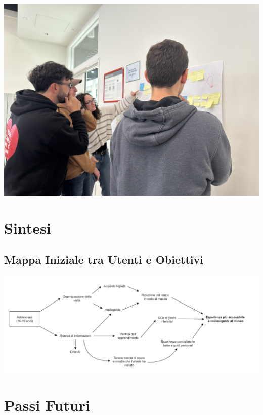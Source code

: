 \documentclass{article}
\begin{document}
\vspace*{\fill}
\begin{center}
    \includegraphics[width=\textwidth]{affinity_diagram.png} %
\end{center}
\vspace*{\fill}

\section{Sintesi}

\subsection{Mappa Iniziale tra Utenti e Obiettivi}
\vspace*{\fill}
\begin{center}
    \includegraphics[width=\textwidth]{map.png}
\end{center}
\vspace*{\fill}

\section{Passi Futuri}
\end{document}
